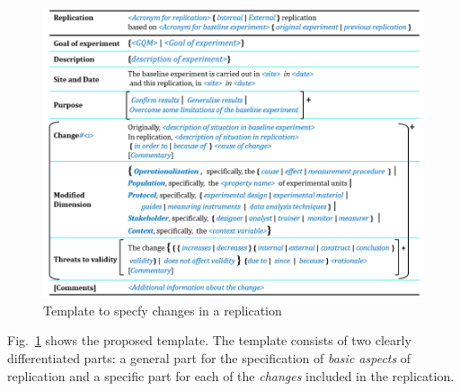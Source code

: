 \begin{figure}[h]
    \includegraphics[width=1\textwidth]{figures/Template.png}
    \caption{Template to specfy changes in a replication}
    \label{fig:Template-V1} 
\end{figure}



Fig.~\ref{fig:Template-V1} shows the proposed template.
The template consists of two clearly differentiated parts: a general part for the specification of \textit{basic aspects} of replication and a specific part for each of the \textit{changes} included in the replication.

